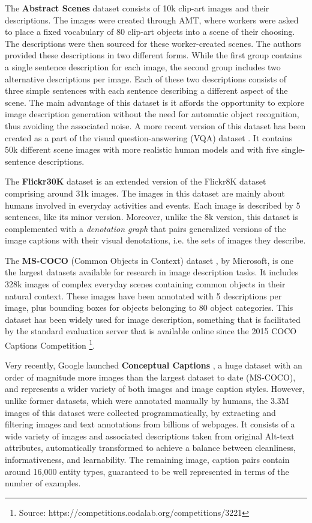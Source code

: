 The \textbf{Abstract Scenes} dataset \citep{Zitnick2013} consists of 10k clip-art images and their descriptions. The images were created through AMT, where workers were asked to place a fixed vocabulary of 80 clip-art objects into a scene of their choosing. The descriptions were then sourced for these worker-created scenes. The authors provided these descriptions in two different forms. While the first group contains a single sentence description for each image, the second group includes two alternative descriptions per image. Each of these two descriptions consists of three simple sentences with each sentence describing a different aspect of the scene. The main advantage of this dataset is it affords the opportunity to explore image description generation without the need for automatic object recognition, thus avoiding the associated noise. A more recent version of this dataset has been created as a part of the visual question-answering (VQA) dataset \citep{Antol2015}. It contains 50k different scene images with more realistic human models and with five single-sentence descriptions. 

The \textbf{Flickr30K} dataset \citep{Young2014} is an extended version of the Flickr8K dataset comprising around 31k images. The images in this dataset are mainly about humans involved in everyday activities and events. Each image is described by 5 sentences, like its minor version. Moreover, unlike the 8k version, this dataset is complemented with a \textit{denotation graph} that pairs generalized versions of the image captions with their visual denotations, i.e. the sets of images they describe.

The \textbf{MS-COCO} (Common Objects in Context) dataset \citep{Lin2014}, by Microsoft, is one the largest datasets available for research in image description tasks. It includes 328k images of complex everyday scenes containing common objects in their natural context.  These images have been annotated with 5 descriptions per image, plus bounding boxes for objects belonging to 80 object categories. This dataset has been widely used for image description, something that is facilitated by the standard evaluation server that is available online since the 2015 COCO Captions Competition \footnote{Source: https://competitions.codalab.org/competitions/3221}. 

Very recently, Google launched \textbf{Conceptual Captions} \citep{Sharma2018}, a huge dataset with an order of magnitude more images than the largest dataset to date (MS-COCO), and represents a wider variety of both images and image caption styles. However, unlike former datasets, which were annotated manually by humans, the 3.3M images of this dataset were collected programmatically, by extracting and filtering images and text annotations from billions of webpages. It consists of a wide variety of images and associated descriptions taken from original Alt-text attributes, automatically transformed to achieve a balance between cleanliness, informativeness, and learnability. The remaining image, caption pairs contain around 16,000 entity types, guaranteed to be well represented in terms of the number of examples.

